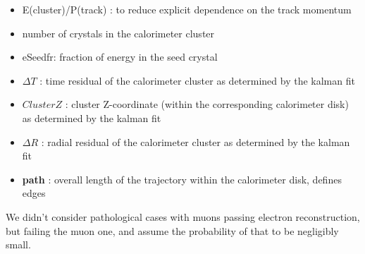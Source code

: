 \begin{itemize}
\item 
  E(cluster)/P(track) : to reduce explicit dependence on the track momentum 
\item 
  number of crystals in the calorimeter cluster
\item 
  eSeedfr: fraction of energy in the seed crystal
\item 
  $\Delta T$ : time residual of the calorimeter cluster as determined by the kalman fit
\item 
  $Cluster Z$ : cluster Z-coordinate (within the corresponding calorimeter disk) as determined by the kalman fit
\item 
  $\Delta R$ : radial residual of the calorimeter cluster as determined by the kalman fit
\item 
  {\bf path} : overall length of the trajectory within the calorimeter disk, defines edges
\end{itemize}

We didn't consider pathological cases with muons passing electron reconstruction, but failing
the muon one, and assume the probability of that to be negligibly small.

